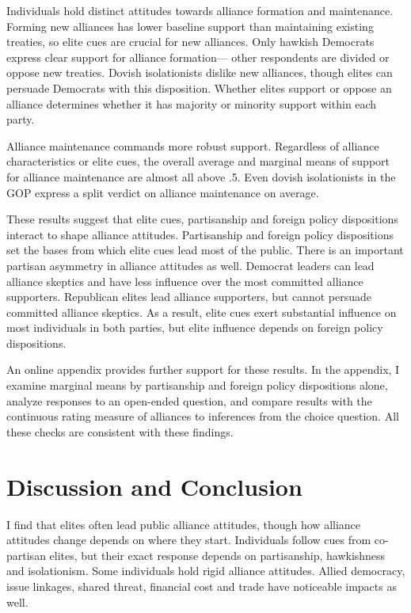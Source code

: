\documentclass[12pt]{article}
\begin{document}
Individuals hold distinct attitudes towards alliance formation and maintenance. 
Forming new alliances has lower baseline support than maintaining existing treaties, so elite cues are crucial for new alliances. 
Only hawkish Democrats express clear support for alliance formation--- other respondents are divided or oppose new treaties.
Dovish isolationists dislike new alliances, though elites can persuade Democrats with this disposition. 
Whether elites support or oppose an alliance determines whether it has majority or minority support within each party. 


Alliance maintenance commands more robust support. 
Regardless of alliance characteristics or elite cues, the overall average and marginal means of support for alliance maintenance are almost all above .5. 
Even dovish isolationists in the GOP express a split verdict on alliance maintenance on average.


These results suggest that elite cues, partisanship and foreign policy dispositions interact to shape alliance attitudes.
Partisanship and foreign policy dispositions set the bases from which elite cues lead most of the public. 
There is an important partisan asymmetry in alliance attitudes as well. 
Democrat leaders can lead alliance skeptics and have less influence over the most committed alliance supporters. 
Republican elites lead alliance supporters, but cannot persuade committed alliance skeptics. 
As a result, elite cues exert substantial influence on most individuals in both parties, but elite influence depends on foreign policy dispositions. 


An online appendix provides further support for these results. 
In the appendix, I examine marginal means by partisanship and foreign policy dispositions alone, analyze responses to an open-ended question, and compare results with the continuous rating measure of alliances to inferences from the choice question.
All these checks are consistent with these findings. 


\section{Discussion and Conclusion} 


I find that elites often lead public alliance attitudes, though how alliance attitudes change depends on where they start.  
Individuals follow cues from co-partisan elites, but their exact response depends on partisanship, hawkishness and isolationism. 
Some individuals hold rigid alliance attitudes. 
Allied democracy, issue linkages, shared threat, financial cost and trade have noticeable impacts as well.  
\end{document}
